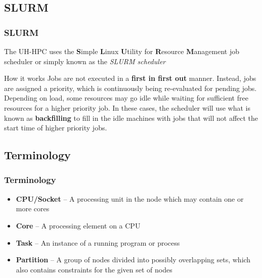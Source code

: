 \subsection{SLURM}
\begin{frame}
  \frametitle{SLURM}
  The UH-HPC uses the \textbf{S}imple \textbf{L}inux \textbf{U}tility for \textbf{R}esource \textbf{M}anagement job~\\scheduler or simply known as the \emph{SLURM scheduler}
  
  \begin{block}{How it works}
    Jobs are not executed in a \textbf{first in first out} manner.  Instead, jobs are assigned a priority, which is continuously being re-evaluated for pending jobs.
    Depending on load, some resources may go idle while waiting for sufficient free resources for a higher priority job.
    In these cases, the scheduler will use what is known as \textbf{backfilling} to fill in the idle machines with jobs that will not affect the start time of higher priority jobs.
	\end{block}
    
       
\end{frame}

\subsection{Terminology}

\begin{frame}
	\frametitle{Terminology}
	\begin{itemize}
	      \item \textbf{CPU/Socket} -- A processing unit in the node which may contain one or more cores
	      \item \textbf{Core} -- A processing element on a CPU 
	      \item \textbf{Task} -- An instance of a running program or process
	      \item \textbf{Partition} -- A group of nodes divided into possibly overlapping sets, which also contains constraints for the given set of nodes
                
	\end{itemize}
\end{frame}

